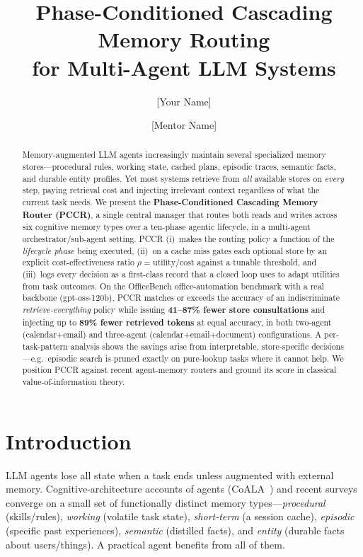 \documentclass[10pt,twocolumn]{article}
\title{\textbf{Phase-Conditioned Cascading Memory Routing\\ for Multi-Agent LLM Systems}}
\author[1]{[Your Name]}
\author[1]{[Mentor Name]}
\affil[1]{[Affiliation] \quad \texttt{[email]}}
\date{}
\begin{document}
\maketitle

\begin{abstract}
\noindent
Memory-augmented LLM agents increasingly maintain several specialized memory
stores---procedural rules, working state, cached plans, episodic traces,
semantic facts, and durable entity profiles. Yet most systems retrieve from
\emph{all} available stores on \emph{every} step, paying retrieval cost and
injecting irrelevant context regardless of what the current task needs. We
present the \textbf{Phase-Conditioned Cascading Memory Router (PCCR)}, a single
central manager that routes both reads and writes across six cognitive memory
types over a ten-phase agentic lifecycle, in a multi-agent
orchestrator/sub-agent setting. PCCR (i)~makes the routing policy a function of
the \emph{lifecycle phase} being executed, (ii)~on a cache miss gates each
optional store by an explicit cost-effectiveness ratio
$\rho = \text{utility}/\text{cost}$ against a tunable threshold, and
(iii)~logs every decision as a first-class record that a closed loop uses to
adapt utilities from task outcomes. On the OfficeBench office-automation
benchmark with a real backbone (gpt-oss-120b), PCCR matches or exceeds the
accuracy of an indiscriminate \emph{retrieve-everything} policy while issuing
\textbf{41--87\% fewer store consultations} and injecting up to \textbf{89\%
fewer retrieved tokens} at equal accuracy, in both two-agent (calendar+email)
and three-agent (calendar+email+document) configurations. A per-task-pattern
analysis shows the savings arise from interpretable, store-specific
decisions---e.g.\ episodic search is pruned exactly on pure-lookup tasks where
it cannot help. We position PCCR against recent agent-memory routers and ground
its score in classical value-of-information theory.
\end{abstract}

\section{Introduction}
LLM agents lose all state when a task ends unless augmented with external
memory. Cognitive-architecture accounts of agents (CoALA~\cite{coala}) and
recent surveys~\cite{survey1,survey2} converge on a small set of functionally
distinct memory types---\emph{procedural} (skills/rules), \emph{working}
(volatile task state), \emph{short-term} (a session cache), \emph{episodic}
(specific past experiences), \emph{semantic} (distilled facts), and
\emph{entity} (durable facts about users/things). A practical agent benefits
from all of them.
\end{document}
